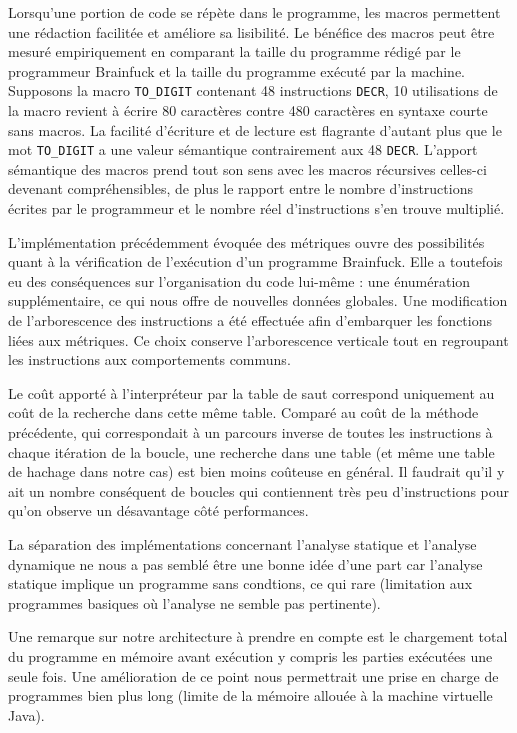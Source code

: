 \documentclass[titlepage]{article}
\begin{document}
Lorsqu’une portion de code se répète dans le programme, les macros permettent une rédaction facilitée et améliore sa lisibilité. Le bénéfice des macros peut être mesuré empiriquement en comparant la taille du programme rédigé par le programmeur Brainfuck et la taille du programme exécuté par la machine. Supposons la macro \texttt{TO\_DIGIT} contenant 48 instructions \texttt{DECR}, 10 utilisations de la macro revient à écrire 80 caractères contre 480 caractères en syntaxe courte sans macros. La facilité d'écriture et de lecture est flagrante d'autant plus que le mot \texttt{TO\_DIGIT} a une valeur sémantique contrairement aux 48 \texttt{DECR}. L'apport sémantique des macros prend tout son sens avec les macros récursives celles-ci devenant compréhensibles, de plus le rapport entre le nombre d'instructions écrites par le programmeur et le nombre réel d'instructions s'en trouve multiplié.

L'implémentation précédemment évoquée des métriques ouvre des possibilités quant à la vérification de l'exécution d'un programme Brainfuck. Elle a toutefois eu des conséquences sur l'organisation du code lui-même : une énumération supplémentaire, ce qui nous offre de nouvelles données globales. Une modification de l'arborescence des instructions a été effectuée afin d'embarquer les fonctions liées aux métriques. Ce choix conserve l'arborescence verticale tout en regroupant les instructions aux comportements communs. 

Le coût apporté à l'interpréteur par la table de saut correspond uniquement au coût de la recherche dans cette même table. Comparé au coût de la méthode précédente, qui correspondait à un parcours inverse de toutes les instructions à chaque itération de la boucle, une recherche dans une table (et même une table de hachage dans notre cas) est bien moins coûteuse en général. Il faudrait qu'il y ait un nombre conséquent de boucles qui contiennent très peu d'instructions pour qu'on observe un désavantage côté performances.

La séparation des implémentations concernant l'analyse statique et l'analyse dynamique ne nous a pas semblé être une bonne idée d'une part car l'analyse  statique implique un programme sans condtions, ce qui rare (limitation aux programmes basiques où l'analyse ne semble pas pertinente).

Une remarque sur notre architecture à prendre en compte est le chargement total du programme en mémoire avant exécution y compris les parties exécutées une seule fois. Une amélioration de ce point nous permettrait une prise en charge de programmes bien plus long (limite de la mémoire allouée à la machine virtuelle Java).
\end{document}
